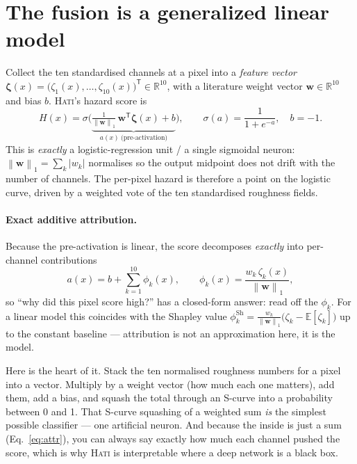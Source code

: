 \documentclass[11pt]{article}
\theoremstyle{definition}
\newcommand{\R}{\mathbb{R}}
\newcommand{\Ex}{\mathbb{E}}
\newcommand{\norm}[1]{\left\lVert #1 \right\rVert}
\newcommand{\abs}[1]{\left\lvert #1 \right\rvert}
\newcommand{\T}{^{\mathsf{T}}}
\begin{document}
\section{The fusion is a generalized linear model}

Collect the ten standardised channels at a pixel into a \emph{feature vector}
$\boldsymbol\zeta(x)=\big(\zeta_1(x),\dots,\zeta_{10}(x)\big)\T\in\R^{10}$, with a
literature weight vector $\mathbf w\in\R^{10}$ and bias $b$. \textsc{Hati}'s hazard
score is
\begin{equation}
\boxed{\;H(x)=\sigma\!\Big(\underbrace{\tfrac{1}{\norm{\mathbf w}_1}\,\mathbf w\T\boldsymbol\zeta(x)+b}_{\textstyle a(x)\ \text{(pre-activation)}}\Big),\qquad
\sigma(a)=\frac{1}{1+e^{-a}},\quad b=-1.\;}
\label{eq:fuse}
\end{equation}
This is \emph{exactly} a logistic-regression unit / a single sigmoidal neuron:
$\norm{\mathbf w}_1=\sum_k\abs{w_k}$ normalises so the output midpoint does not drift
with the number of channels. The per-pixel hazard is therefore a point on the
logistic curve, driven by a weighted vote of the ten standardised roughness fields.

\paragraph{Exact additive attribution.} Because the pre-activation is linear, the
score decomposes \emph{exactly} into per-channel contributions
\begin{equation}
a(x)=b+\sum_{k=1}^{10}\phi_k(x),\qquad \phi_k(x)=\frac{w_k\,\zeta_k(x)}{\norm{\mathbf w}_1},
\label{eq:attr}
\end{equation}
so ``why did this pixel score high?'' has a closed-form answer: read off the
$\phi_k$. For a linear model this coincides with the Shapley value
$\phi_k^{\text{Sh}}=\frac{w_k}{\norm{\mathbf w}_1}\big(\zeta_k-\Ex[\zeta_k]\big)$ up to
the constant baseline --- attribution is not an approximation here, it is the model.

\begin{words}
Here is the heart of it. Stack the ten normalised roughness numbers for a pixel into
a vector. Multiply by a weight vector (how much each one matters), add them, add a
bias, and squash the total through an S-curve into a probability between 0 and 1.
That S-curve squashing of a weighted sum \emph{is} the simplest possible classifier
--- one artificial neuron. And because the inside is just a sum
(Eq.~\ref{eq:attr}), you can always say exactly how much each channel pushed the
score, which is why \textsc{Hati} is interpretable where a deep network is a black
box.
\end{words}
\end{document}
